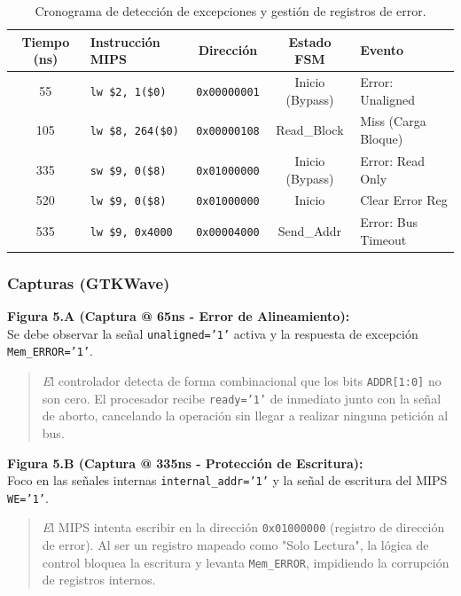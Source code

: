 \documentclass[12pt,a4paper]{article}
\begin{document}
\begin{table}[H]
\centering
\small
\renewcommand{\arraystretch}{1.2}
\begin{tabular}{|c|l|c|c|l|}
\hline
\rowcolor[HTML]{EFEFEF} 
\textbf{Tiempo (ns)} & \textbf{Instrucción MIPS} & \textbf{Dirección} & \textbf{Estado FSM} & \textbf{Evento} \\ \hline
55  & \texttt{lw \$2, 1(\$0)}    & \texttt{0x00000001} & Inicio (Bypass)    & Error: Unaligned   \\ \hline
105 & \texttt{lw \$8, 264(\$0)}  & \texttt{0x00000108} & Read\_Block        & Miss (Carga Bloque) \\ \hline
335 & \texttt{sw \$9, 0(\$8)}    & \texttt{0x01000000} & Inicio (Bypass)    & Error: Read Only   \\ \hline
520 & \texttt{lw \$9, 0(\$8)}    & \texttt{0x01000000} & Inicio             & Clear Error Reg    \\ \hline
535 & \texttt{lw \$9, 0x4000}    & \texttt{0x00004000} & Send\_Addr         & Error: Bus Timeout \\ \hline
\end{tabular}
\caption{Cronograma de detección de excepciones y gestión de registros de error.}
\end{table}

\subsubsection{ Capturas (GTKWave)}

\textbf{Figura 5.A (Captura @ 65ns - Error de Alineamiento):} \\
Se debe observar la señal \texttt{unaligned='1'} activa y la respuesta de excepción \texttt{Mem\_ERROR='1'}. 
\begin{quote}
    \textit El controlador detecta de forma combinacional que los bits \texttt{ADDR[1:0]} no son cero. El procesador recibe \texttt{ready='1'} de inmediato junto con la señal de aborto, cancelando la operación sin llegar a realizar ninguna petición al bus.
\end{quote}

\textbf{Figura 5.B (Captura @ 335ns - Protección de Escritura):} \\
Foco en las señales internas \texttt{internal\_addr='1'} y la señal de escritura del MIPS \texttt{WE='1'}.
\begin{quote}
    \textit El MIPS intenta escribir en la dirección \texttt{0x01000000} (registro de dirección de error). Al ser un registro mapeado como "Solo Lectura", la lógica de control bloquea la escritura y levanta \texttt{Mem\_ERROR}, impidiendo la corrupción de registros internos.
\end{quote}
\end{document}
